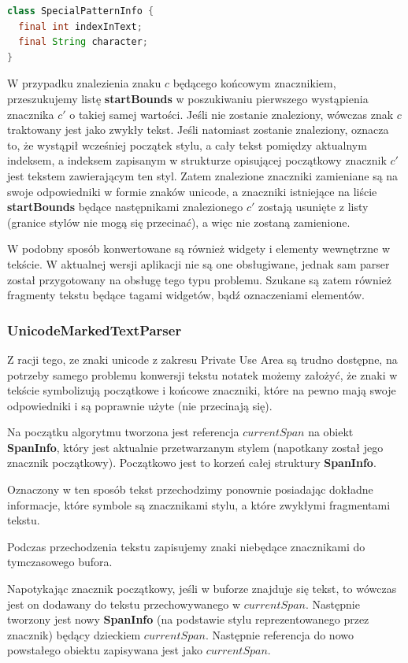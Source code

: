 \begin{lstlisting}[language=Java]
class SpecialPatternInfo {
  final int indexInText;
  final String character;
}
\end{lstlisting}

W przypadku znalezienia znaku $c$ będącego końcowym znacznikiem, przeszukujemy listę \textbf{startBounds} w poszukiwaniu pierwszego wystąpienia znacznika $c'$ o takiej samej wartości. Jeśli nie zostanie znaleziony, wówczas znak $c$ traktowany jest jako zwykły tekst. Jeśli natomiast zostanie znaleziony, oznacza to, że wystąpił wcześniej początek stylu, a cały tekst pomiędzy aktualnym indeksem, a indeksem zapisanym w strukturze opisującej początkowy znacznik $c'$ jest tekstem zawierającym ten styl. Zatem znalezione znaczniki zamieniane są na swoje odpowiedniki w formie znaków unicode, a znaczniki istniejące na liście \textbf{startBounds} będące następnikami znalezionego $c'$ zostają usunięte z listy (granice stylów nie mogą się przecinać), a więc nie zostaną zamienione.

W podobny sposób konwertowane są również widgety i elementy wewnętrzne w tekście. W aktualnej wersji aplikacji nie są one obsługiwane, jednak sam parser został przygotowany na obsługę tego typu problemu. Szukane są zatem również fragmenty tekstu będące tagami widgetów, bądź oznaczeniami elementów.

\subsubsection{UnicodeMarkedTextParser}

Z racji tego, ze znaki unicode z zakresu Private Use Area są trudno dostępne, na potrzeby samego problemu konwersji tekstu notatek możemy założyć, że znaki w tekście symbolizują początkowe i końcowe znaczniki, które na pewno mają swoje odpowiedniki i są poprawnie użyte (nie przecinają się).

Na początku algorytmu tworzona jest referencja $currentSpan$ na obiekt \textbf{SpanInfo}, który jest aktualnie przetwarzanym stylem (napotkany został jego znacznik początkowy). Początkowo jest to korzeń całej struktury \textbf{SpanInfo}.

Oznaczony w ten sposób tekst przechodzimy ponownie posiadając dokładne informacje, które symbole są znacznikami stylu, a które zwykłymi fragmentami tekstu.

Podczas przechodzenia tekstu zapisujemy znaki niebędące znacznikami do tymczasowego bufora.

Napotykając znacznik początkowy, jeśli w buforze znajduje się tekst, to wówczas jest on dodawany do tekstu przechowywanego w $currentSpan$. Następnie tworzony jest nowy \textbf{SpanInfo} (na podstawie stylu reprezentowanego przez znacznik) będący dzieckiem $currentSpan$. Następnie referencja do nowo powstałego obiektu zapisywana jest jako $currentSpan$. 

